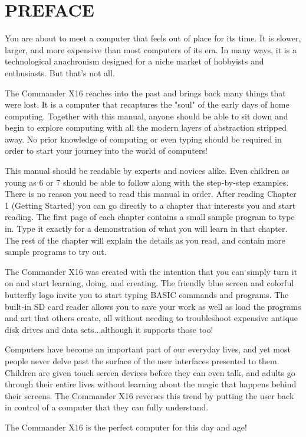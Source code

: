 
\section*{PREFACE}

\par You are about to meet a computer that feels out of place for its time.  It
is slower, larger, and more expensive than most computers of its era.  In many
ways, it is a technological anachronism designed for a niche market of
hobbyists and enthusiasts.  But that's not all.

\medskip\par
The Commander X16 reaches into the past and brings back many things that
were lost.  It is a computer that recaptures the "soul" of the early days of
home computing.  Together with this manual, anyone should be able to sit down
and begin to explore computing with all the modern layers of abstraction
stripped away.  No prior knowledge of computing or even typing should be
required in order to start your journey into the world of computers!

\medskip\par
This manual should be readable by experts and novices alike.  Even children as
young as 6 or 7 should be able to follow along with the step-by-step examples.
There is no reason you need to read this manual in order.  After reading
Chapter 1 (Getting Started) you can go directly to a chapter that interests you
and start reading.  The first page of each chapter contains a small sample
program to type in.  Type it exactly for a demonstration of what you will learn
in that chapter.  The rest of the chapter will explain the details as you read,
and contain more sample programs to try out.

\medskip \par
The Commander X16 was created with the intention that you can simply turn it on
and start learning, doing, and creating.  The friendly blue screen and colorful
butterfly logo invite you to start typing BASIC commands and programs.  The
built-in SD card reader allows you to save your work as well as load the
programs and art that others create, all without needing to troubleshoot
expensive antique disk drives and data sets...although it supports those too!

\medskip\par
Computers have become an important part of our everyday lives, and yet most
people never delve past the surface of the user interfaces presented to them.
Children are given touch screen devices before they can even talk, and adults
go through their entire lives without learning about the magic that happens
behind their screens.  The Commander X16 reverses this trend by putting the
user back in control of a computer that they can fully understand.

\medskip\par
The Commander X16 is the perfect computer for this day and age!
